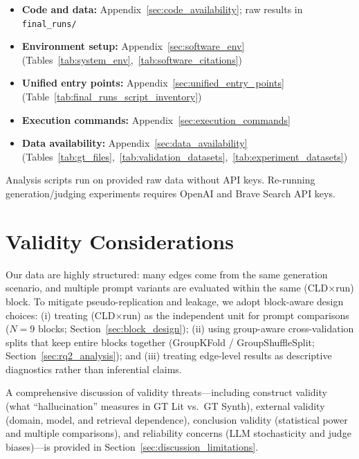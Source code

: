 \begin{itemize}[noitemsep]
    \item \textbf{Code and data:} Appendix~\ref{sec:code_availability}; raw results in \texttt{final\_runs/}
    \item \textbf{Environment setup:} Appendix~\ref{sec:software_env} (Tables~\ref{tab:system_env},~\ref{tab:software_citations})
    \item \textbf{Unified entry points:} Appendix~\ref{sec:unified_entry_points} (Table~\ref{tab:final_runs_script_inventory})
    \item \textbf{Execution commands:} Appendix~\ref{sec:execution_commands}
    \item \textbf{Data availability:} Appendix~\ref{sec:data_availability} (Tables~\ref{tab:gt_files},~\ref{tab:validation_datasets},~\ref{tab:experiment_datasets})
\end{itemize}

\noindent Analysis scripts run on provided raw data without API keys. Re-running generation/judging experiments requires OpenAI and Brave Search API keys.

\section{Validity Considerations}
\label{sec:threats_to_validity}

Our data are highly structured: many edges come from the same generation scenario, and multiple prompt variants are evaluated within the same (CLD$\times$run) block. To mitigate pseudo-replication and leakage, we adopt block-aware design choices: (i) treating (CLD$\times$run) as the independent unit for prompt comparisons ($N=9$ blocks; Section~\ref{sec:block_design}); (ii) using group-aware cross-validation splits that keep entire blocks together (GroupKFold / GroupShuffleSplit; Section~\ref{sec:rq2_analysis}); and (iii) treating edge-level results as descriptive diagnostics rather than inferential claims.

A comprehensive discussion of validity threats---including construct validity (what ``hallucination'' measures in GT Lit vs.\ GT Synth), external validity (domain, model, and retrieval dependence), conclusion validity (statistical power and multiple comparisons), and reliability concerns (LLM stochasticity and judge biases)---is provided in Section~\ref{sec:discussion_limitations}.